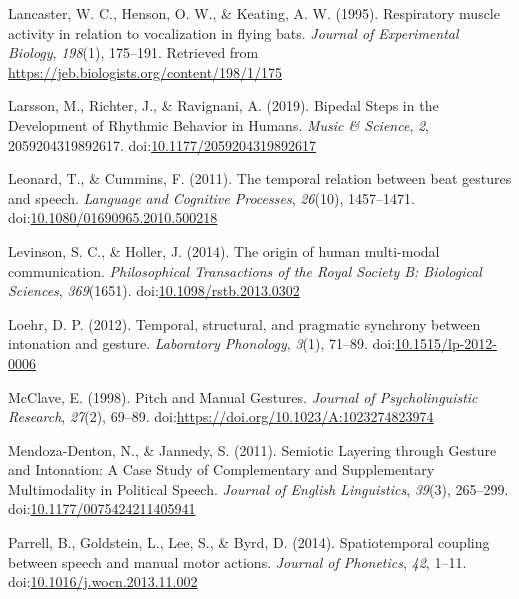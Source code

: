 \documentclass[
  man,floatsintext]{apa6}
\newlength{\cslhangindent}
\newenvironment{cslreferences}%
  {\setlength{\parindent}{0pt}%
  \everypar{\setlength{\hangindent}{\cslhangindent}}\ignorespaces}%
  {\par}
\begin{document}
\begin{cslreferences}
\leavevmode\hypertarget{ref-lancasterRespiratoryMuscleActivity1995}{}%
Lancaster, W. C., Henson, O. W., \& Keating, A. W. (1995). Respiratory muscle activity in relation to vocalization in flying bats. \emph{Journal of Experimental Biology}, \emph{198}(1), 175--191. Retrieved from \url{https://jeb.biologists.org/content/198/1/175}

\leavevmode\hypertarget{ref-larssonBipedalStepsDevelopment2019}{}%
Larsson, M., Richter, J., \& Ravignani, A. (2019). Bipedal Steps in the Development of Rhythmic Behavior in Humans. \emph{Music \& Science}, \emph{2}, 2059204319892617. doi:\href{https://doi.org/10.1177/2059204319892617}{10.1177/2059204319892617}

\leavevmode\hypertarget{ref-leonardTemporalRelationBeat2011}{}%
Leonard, T., \& Cummins, F. (2011). The temporal relation between beat gestures and speech. \emph{Language and Cognitive Processes}, \emph{26}(10), 1457--1471. doi:\href{https://doi.org/10.1080/01690965.2010.500218}{10.1080/01690965.2010.500218}

\leavevmode\hypertarget{ref-levinsonOriginHumanMultimodal2014}{}%
Levinson, S. C., \& Holler, J. (2014). The origin of human multi-modal communication. \emph{Philosophical Transactions of the Royal Society B: Biological Sciences}, \emph{369}(1651). doi:\href{https://doi.org/10.1098/rstb.2013.0302}{10.1098/rstb.2013.0302}

\leavevmode\hypertarget{ref-loehrTemporalStructuralPragmatic2012}{}%
Loehr, D. P. (2012). Temporal, structural, and pragmatic synchrony between intonation and gesture. \emph{Laboratory Phonology}, \emph{3}(1), 71--89. doi:\href{https://doi.org/10.1515/lp-2012-0006}{10.1515/lp-2012-0006}

\leavevmode\hypertarget{ref-mcclavePitchManualGestures1998}{}%
McClave, E. (1998). Pitch and Manual Gestures. \emph{Journal of Psycholinguistic Research}, \emph{27}(2), 69--89. doi:\href{https://doi.org/https://doi.org/10.1023/A:1023274823974}{https://doi.org/10.1023/A:1023274823974}

\leavevmode\hypertarget{ref-mendoza-dentonSemioticLayeringGesture2011}{}%
Mendoza-Denton, N., \& Jannedy, S. (2011). Semiotic Layering through Gesture and Intonation: A Case Study of Complementary and Supplementary Multimodality in Political Speech. \emph{Journal of English Linguistics}, \emph{39}(3), 265--299. doi:\href{https://doi.org/10.1177/0075424211405941}{10.1177/0075424211405941}

\leavevmode\hypertarget{ref-parrellSpatiotemporalCouplingSpeech2014}{}%
Parrell, B., Goldstein, L., Lee, S., \& Byrd, D. (2014). Spatiotemporal coupling between speech and manual motor actions. \emph{Journal of Phonetics}, \emph{42}, 1--11. doi:\href{https://doi.org/10.1016/j.wocn.2013.11.002}{10.1016/j.wocn.2013.11.002}


\end{cslreferences}
\end{document}
